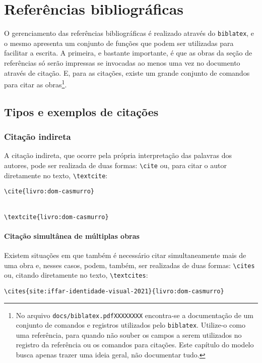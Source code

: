 \section{Referências bibliográficas}
O gerenciamento das referências bibliográficas é realizado através do \verb|biblatex|, e o mesmo apresenta um conjunto de funções que podem ser utilizadas para facilitar a escrita. A primeira, e bastante importante, é que as obras da seção de referências só serão impressas se invocadas ao menos uma vez no documento através de citação. E, para as citações, existe um grande conjunto de comandos para citar as obras\footnote{\label{nota:biblatex-cheatsheet}No arquivo \texttt{docs/biblatex.pdfXXXXXXXX} encontra-se a documentação de um conjunto de comandos e registros utilizados pelo \texttt{biblatex}. Utilize-o como uma referência, para quando não souber os campos a serem utilizados no registro da referência ou os comandos para citações. Este capítulo do modelo busca apenas trazer uma ideia geral, não documentar tudo.}.

\subsection{Tipos e exemplos de citações}
\subsubsection{Citação indireta}
A citação indireta, que ocorre pela própria interpretação das palavras dos autores, pode ser realizada de duas formas: \verb|\cite| ou, para citar o autor diretamente no texto, \verb|\textcite|:

\verb|\cite{livro:dom-casmurro}|

\cite{livro:dom-casmurro}\\

\verb|\textcite{livro:dom-casmurro}|

\textcite{livro:dom-casmurro}

\paragraph{Citação simultânea de múltiplas obras}
Existem situações em que também é necessário citar simultaneamente mais de uma obra e, nesses casos, podem, também, ser realizadas de duas formas: \verb|\cites| ou, citando diretamente no texto, \verb|\textcites|:

\verb|\cites{site:iffar-identidade-visual-2021}{livro:dom-casmurro}|

